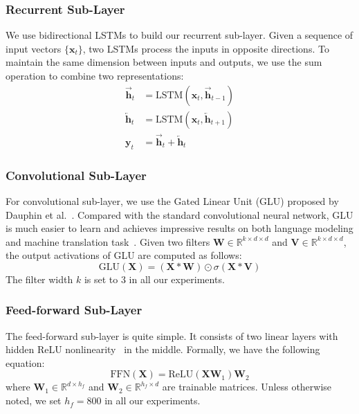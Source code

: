 \documentclass[letterpaper]{article} \usepackage{aaai18}  \usepackage{times}  \usepackage{helvet}  \usepackage{courier}  \usepackage{url}  \usepackage{graphicx}  \frenchspacing  \setlength{\pdfpagewidth}{8.5in}  \setlength{\pdfpageheight}{11in}  \usepackage{latexsym}
\begin{document}
\subsubsection{Recurrent Sub-Layer}
We use bidirectional LSTMs to build our recurrent sub-layer. Given a sequence of input vectors $\{\mathbf{x}_t\}$, two LSTMs process the inputs in opposite directions. To maintain the same dimension between inputs and outputs, we use the sum operation to combine two representations:
\begin{align}
  \overrightarrow{\mathbf{h}}_t &= \textrm{LSTM}(\mathbf{x}_t, \overrightarrow{\mathbf{h}}_{t-1})\\
  \overleftarrow{\mathbf{h}}_t &= \textrm{LSTM}(\mathbf{x}_t, \overleftarrow{\mathbf{h}}_{t+1})\\
  \mathbf{y}_t &= \overrightarrow{\mathbf{h}}_t + \overleftarrow{\mathbf{h}}_t
\end{align}

\subsubsection{Convolutional Sub-Layer}
For convolutional sub-layer, we use the Gated Linear Unit (GLU) proposed by Dauphin et al.~. Compared with the standard convolutional neural network, GLU is much easier to learn and achieves impressive results on both language modeling and machine translation task~\cite{dauphin2016language,gehring2017convolutional}. Given two filters $\mathbf{W} \in \mathbb{R}^{k \times d \times d}$ and $\mathbf{V} \in \mathbb{R}^{k \times d \times d}$, the output activations of GLU are computed as follows:
\begin{equation}
\textrm{GLU}(\mathbf{X}) = (\mathbf{X}*\mathbf{W}) \odot \sigma(\mathbf{X}*\mathbf{V})
\end{equation}
The filter width $k$ is set to 3 in all our experiments.

\subsubsection{Feed-forward Sub-Layer}
The feed-forward sub-layer is quite simple. It consists of two linear layers with hidden ReLU nonlinearity~\cite{nair2010rectified} in the middle. Formally, we have the following equation:
\begin{equation}
\textrm{FFN}(\mathbf{X}) = \textrm{ReLU}(\mathbf{X}\mathbf{W}_1)\mathbf{W}_2
\end{equation}
where $\mathbf{W}_1 \in \mathbb{R}^{d \times h_f}$ and $\mathbf{W}_2 \in \mathbb{R}^{h_f \times d}$ are trainable matrices. Unless otherwise noted, we set $h_f = 800$ in all our experiments.
\end{document}
